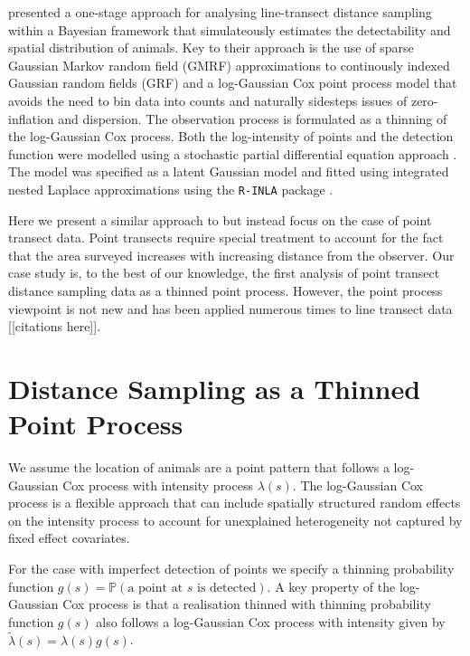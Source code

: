 \documentclass[preprint,12pt]{elsarticle}
\newcommand{\tl}{\tilde{\lambda}}   %
\begin{document}
\citet{yuan_point_2017} presented a one-stage approach for analysing line-transect distance sampling within a Bayesian framework that simulateously estimates the detectability 
and spatial distribution of animals.  Key to their approach is the use of sparse Gaussian Markov random field (GMRF) approximations to continously indexed Gaussian random fields (GRF) and a log-Gaussian Cox point process model that avoids the need to bin data into counts and naturally sidesteps issues of zero-inflation and dispersion.  The observation process is formulated as a thinning of the log-Gaussian Cox process.  Both the log-intensity of points and the detection function were modelled using a stochastic partial differential equation approach \citep{lindgren_explicit_2011}.  The model was specified as a latent Gaussian model and fitted using integrated nested Laplace approximations using the \texttt{R-INLA} package \citep{rue_approximate_2009}.  

Here we present a similar approach to \citet{yuan_point_2017} but instead focus on the case of point transect data.  Point transects require special treatment to account for the fact that the area surveyed increases with increasing distance from the observer.  Our case study is, to the best of our knowledge, the first analysis of point transect distance sampling data as a thinned point process.  However, the point process viewpoint is not new and has been applied numerous times to line transect data [[citations here]].  

\section*{Distance Sampling as a Thinned Point Process}

We assume the location of animals are a point pattern that follows a log-Gaussian Cox process with intensity process $\lambda(s)$.  The log-Gaussian Cox process is a flexible approach that can include spatially structured random effects on the intensity process to account for unexplained heterogeneity not captured by fixed effect covariates.  

\sloppy For the case with imperfect detection of points we specify a thinning probability function $g(s) = \mathbb{P}(\text{a point at $s$ is detected})$. A key property of the log-Gaussian Cox process is that a realisation thinned with thinning probability function $g(s)$ also follows a log-Gaussian Cox process with intensity given by $\tl(s) = \lambda(s)g(s)$.  
\end{document}
